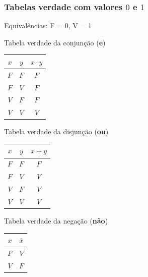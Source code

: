 \documentclass{beamer}
\begin{document}

\begin{frame}
 \frametitle{Tabelas verdade com valores $0$ e $1$}
Equivalências: F = 0, V = 1\\[6pt]

\hspace{4ex}
%
\begin{minipage}{16ex}
\centering
Tabela verdade da conjunção (\textbf{e})\\[6pt]
\begin{tabular}{cc|c}
 $x$ & $y$ & $x \cdot y$ \\
\hline
 $F$ & $F$ & $F$ \\
 $F$ & $V$ & $F$ \\
 $V$ & $F$ & $F$ \\
 $V$ & $V$ & $V$
\end{tabular}
\end{minipage}
%
\hspace{3ex}
%
\begin{minipage}{18ex}
\centering
Tabela verdade da disjunção  (\textbf{ou})\\[6pt]
\begin{tabular}{cc|c}
 $x$ & $y$ & $x + y$ \\
\hline
 $F$ & $F$ & $F$ \\
 $F$ & $V$ & $V$ \\
 $V$ & $F$ & $V$ \\
 $V$ & $V$ & $V$
\end{tabular}
\end{minipage}
%
\hspace{3ex}
%
\begin{minipage}{18ex}
\centering
Tabela verdade da negação  (\textbf{não})\\[12pt]
\begin{tabular}{c|c}
 $x$ & $\overline{x}$ \\
\hline
 $F$ & $V$ \\
 $V$ & $F$
\end{tabular}
\end{minipage}

\pause

\vspace{6pt}


\end{frame}
\end{document}
